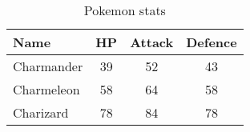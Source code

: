 \begin{table}[h]
    \begin{center}
        \begin{tabular}{|l|c|c|c|}
            \hline
            Name       & HP & Attack & Defence \\ \hline
            Charmander & 39 & 52     & 43      \\ \hline
            Charmeleon & 58 & 64     & 58      \\ \hline
            Charizard  & 78 & 84     & 78      \\ \hline
        \end{tabular}
    \end{center}
    \caption{Pokemon stats}
    \label{tab:pok_stats}
    
\end{table}